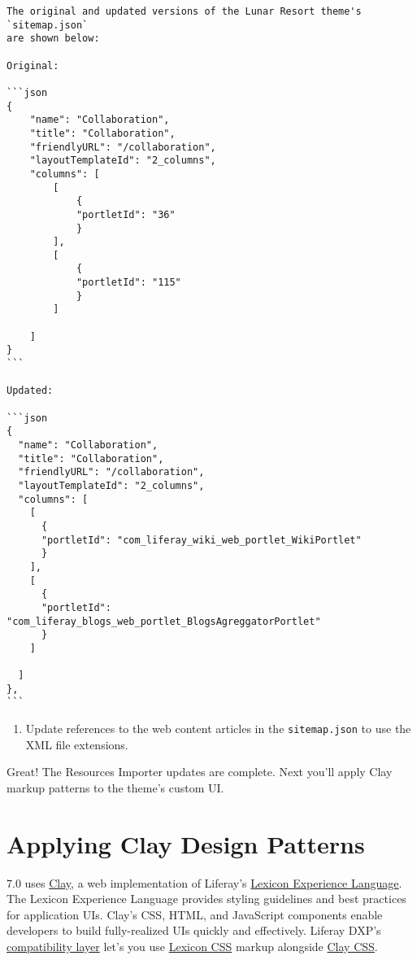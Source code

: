 \noindent\hrulefill

\begin{verbatim}
The original and updated versions of the Lunar Resort theme's `sitemap.json` 
are shown below:

Original:

```json
{
    "name": "Collaboration",
    "title": "Collaboration",
    "friendlyURL": "/collaboration",
    "layoutTemplateId": "2_columns",
    "columns": [
        [
            {
            "portletId": "36"
            }
        ],
        [
            {
            "portletId": "115"
            }
        ]
    
    ]
}
```

Updated:

```json
{
  "name": "Collaboration",
  "title": "Collaboration",
  "friendlyURL": "/collaboration",
  "layoutTemplateId": "2_columns",
  "columns": [
    [
      {
      "portletId": "com_liferay_wiki_web_portlet_WikiPortlet"
      }
    ],
    [
      {
      "portletId": "com_liferay_blogs_web_portlet_BlogsAgreggatorPortlet"
      }
    ]
  
  ]
},
```
\end{verbatim}

\begin{enumerate}
\def\labelenumi{\arabic{enumi}.}
\setcounter{enumi}{1}
\tightlist
\item
  Update references to the web content articles in the
  \texttt{sitemap.json} to use the XML file extensions.
\end{enumerate}

Great! The Resources Importer updates are complete. Next you'll apply
Clay markup patterns to the theme's custom UI.

\chapter{Applying Clay Design
Patterns}\label{applying-clay-design-patterns}

7.0 uses \href{https://clayui.com/}{Clay}, a web implementation of
Liferay's \href{https://lexicondesign.io/}{Lexicon Experience Language}.
The Lexicon Experience Language provides styling guidelines and best
practices for application UIs. Clay's CSS, HTML, and JavaScript
components enable developers to build fully-realized UIs quickly and
effectively. Liferay DXP's
\href{/docs/7-2/tutorials/-/knowledge_base/t/using-the-bootstrap-3-lexicon-css-compatibility-layer}{compatibility
layer} let's you use \href{https://lexiconcss.wedeploy.io/}{Lexicon CSS}
markup alongside \href{https://clayui.com/}{Clay CSS}.

